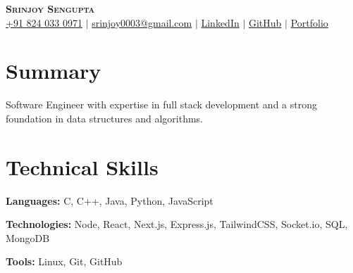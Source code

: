 \documentclass[letterpaper,11pt]{article}
\newcommand{\resumeSubHeadingListStart}{\begin{itemize}[leftmargin=0.15in, label={}]}
\newcommand{\resumeSubHeadingListEnd}{\end{itemize}}
\begin{document}

\begin{center}
    \textbf{\Huge \scshape Srinjoy Sengupta} \\ \vspace{3pt}
    \small
    \faMobile \hspace{.5pt} \href{tel:918240330971}{+91 824 033 0971}
    $|$
    \faAt \hspace{.5pt} \href{srinjoy003@gmail.com}{srinjoy0003@gmail.com}
    $|$
    \faLinkedinSquare \hspace{.5pt} \href{https://linkedin.com/in/srinjoy-sengupta-b28565302}{LinkedIn}
    $|$
    \faGithub \hspace{.5pt} \href{https://github.com/Srinjoy003}{GitHub}
    $|$
    \faGlobe \hspace{.5pt} \href{https://srinjoysengupta.vercel.app/}{Portfolio}
\end{center}


\section{Summary}
  \vspace{2pt}
  \small{
  Software Engineer with expertise in full stack development and a strong foundation in data structures and algorithms.
  }




\section{Technical Skills}
  \vspace{2pt}
  \resumeSubHeadingListStart
    \small{\item{
        
        \textbf{Languages:}{ C, C++, Java, Python, JavaScript} \\ \vspace{3pt}
        
        \textbf{Technologies:}{ Node, React, Next.js, Express.js, TailwindCSS, Socket.io, SQL, MongoDB } \\ \vspace{3pt}
        
        \textbf{Tools:}{ Linux, Git, GitHub} \\ \vspace{3pt}
        
    }}
  \resumeSubHeadingListEnd
\end{document}
